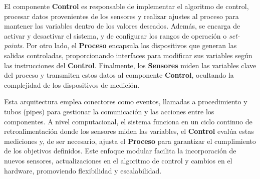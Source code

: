 \begin{figure}[h!]
\end{figure}

El componente \textbf{Control} es responsable de implementar el algoritmo de control, procesar datos provenientes de los sensores y realizar ajustes al proceso para mantener las variables dentro de los valores deseados. Además, se encarga de activar y desactivar el sistema, y de configurar los rangos de operación o \textit{set-points}. Por otro lado, el \textbf{Proceso} encapsula los dispositivos que generan las salidas controladas, proporcionando interfaces para modificar sus variables según las instrucciones del \textbf{Control}. Finalmente, los \textbf{Sensores} miden las variables clave del proceso y transmiten estos datos al componente \textbf{Control}, ocultando la complejidad de los dispositivos de medición.

Esta arquitectura emplea conectores como eventos, llamadas a procedimiento y tubos (pipes) para gestionar la comunicación y las acciones entre los componentes. A nivel computacional, el sistema funciona en un ciclo continuo de retroalimentación donde los sensores miden las variables, el \textbf{Control} evalúa estas mediciones y, de ser necesario, ajusta el \textbf{Proceso} para garantizar el cumplimiento de los objetivos definidos. Este enfoque modular facilita la incorporación de nuevos sensores, actualizaciones en el algoritmo de control y cambios en el hardware, promoviendo flexibilidad y escalabilidad.

